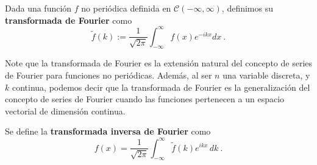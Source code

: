 \begin{defi} 
    Dada una función $f$ no periódica definida en $\mathscr{C}(-\infty, \infty)$, definimos su \textbf{transformada de Fourier} como 
    \begin{equation}\label{T.Fourier}
        \boxed{\tilde{f}(k) := \frac{1}{\sqrt{2\pi}} \int_{-\infty}^{\infty} f(x) e^{-ikx} dx \ .} 
    \end{equation}  
\end{defi}

Note que la transformada de Fourier es la extensión natural del concepto de series de Fourier para funciones no periódicas. Además, al ser $n$ una variable discreta, y $k$ continua, podemos decir que la transformada de Fourier es la generalización del concepto de series de Fourier cuando las funciones pertenecen a un espacio vectorial de dimensión continua.

\begin{defi}
    Se define la \textbf{transformada inversa de Fourier} como
      \begin{equation}\label{I.Fourier}
     \boxed{f(x) = \frac{1}{\sqrt{2\pi}} \int_{-\infty}^{\infty} \tilde{f}(k) e^{ikx} \,dk \ .} 
    \end{equation}  
\end{defi}


